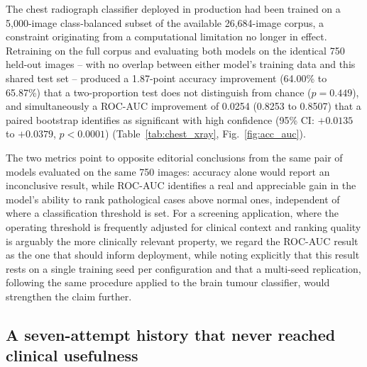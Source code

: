 \documentclass[conference]{IEEEtran}
\begin{document}
The chest radiograph classifier deployed in production had been trained on a 5{,}000-image class-balanced subset of the available 26{,}684-image corpus, a constraint originating from a computational limitation no longer in effect. Retraining on the full corpus and evaluating both models on the identical 750 held-out images -- with no overlap between either model's training data and this shared test set -- produced a 1.87-point accuracy improvement (64.00\% to 65.87\%) that a two-proportion test does not distinguish from chance ($p=0.449$), and simultaneously a ROC-AUC improvement of 0.0254 (0.8253 to 0.8507) that a paired bootstrap identifies as significant with high confidence (95\% CI: $+0.0135$ to $+0.0379$, $p<0.0001$) (Table~\ref{tab:chest_xray}, Fig.~\ref{fig:acc_auc}).



The two metrics point to opposite editorial conclusions from the same pair of models evaluated on the same 750 images: accuracy alone would report an inconclusive result, while ROC-AUC identifies a real and appreciable gain in the model's ability to rank pathological cases above normal ones, independent of where a classification threshold is set. For a screening application, where the operating threshold is frequently adjusted for clinical context and ranking quality is arguably the more clinically relevant property, we regard the ROC-AUC result as the one that should inform deployment, while noting explicitly that this result rests on a single training seed per configuration and that a multi-seed replication, following the same procedure applied to the brain tumour classifier, would strengthen the claim further.

\subsection{A seven-attempt history that never reached clinical usefulness}


\end{document}
